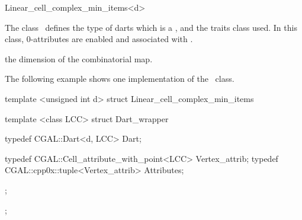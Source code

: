 \ccRefPageBegin

\begin{ccRefClass}{Linear_cell_complex_min_items<d>} %


\ccDefinition
  
The class \ccRefName\ defines the type of darts which is a
, and the traits class used.  In
this class, 0-attributes are enabled and associated with
.

\ccIsModel
{}

\ccParameters
{} the dimension of the combinatorial map. %


\ccExample

The following example shows one implementation of the
\ccRefName\ class.

\begin{ccExampleCode}
  template <unsigned int d>
  struct Linear_cell_complex_min_items
  {
    template <class LCC>
    struct Dart_wrapper
    {
      typedef CGAL::Dart<d, LCC> Dart;

      typedef CGAL::Cell_attribute_with_point<LCC> Vertex_attrib;    
      typedef CGAL::cpp0x::tuple<Vertex_attrib> Attributes;
    };
  };
\end{ccExampleCode}

\end{ccRefClass}

\ccSeeAlso
{}\\

\ccRefPageEnd

